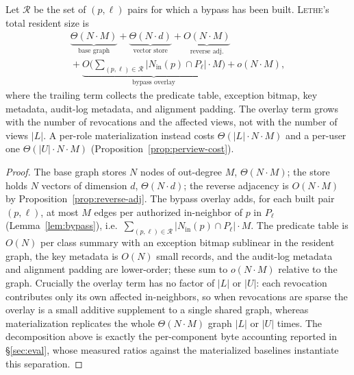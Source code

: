 \documentclass[sigconf, nonacm, review]{acmart}
\newcommand{\Nin}{N_{\mathrm{in}}}
\begin{document}
\begin{proposition}
\label{prop:overlay-space}
Let $\mathcal{R}$ be the set of $(p,\ell)$ pairs for which a bypass has been
built. \textsc{Lethe}'s total resident size is
\[
\begin{gathered}
\underbrace{\Theta(N\cdot M)}_{\text{base graph}}
+\underbrace{\Theta(N\cdot d)}_{\text{vector store}}
+\underbrace{O(N\cdot M)}_{\text{reverse adj.}}\\[2pt]
{}+\underbrace{O\!\Big(\textstyle\sum_{(p,\ell)\in\mathcal{R}}
   |\Nin(p)\cap P_\ell|\cdot M\Big)}_{\text{bypass overlay}}
+ o(N\cdot M),
\end{gathered}
\]
where the trailing term collects the predicate table, exception bitmap, key
metadata, audit-log metadata, and alignment padding. The overlay term grows
with the number of revocations and the affected views, not with the number of
views $|L|$. A per-role materialization instead costs $\Theta(|L|\cdot N\cdot
M)$ and a per-user one $\Theta(|U|\cdot N\cdot M)$
(Proposition~\ref{prop:perview-cost}).
\end{proposition}
\begin{proof}
The base graph stores $N$ nodes of out-degree $M$, $\Theta(N\cdot M)$; the
store holds $N$ vectors of dimension $d$, $\Theta(N\cdot d)$; the reverse
adjacency is $O(N\cdot M)$ by Proposition~\ref{prop:reverse-adj}. The bypass
overlay adds, for each built pair $(p,\ell)$, at most $M$ edges per authorized
in-neighbor of $p$ in $P_\ell$ (Lemma~\ref{lem:bypass}), i.e.\
$\sum_{(p,\ell)\in\mathcal{R}}|\Nin(p)\cap P_\ell|\cdot M$. The predicate table
is $O(N)$ per class summary with an exception bitmap sublinear in the resident
graph, the key metadata is $O(N)$ small records, and the audit-log metadata and
alignment padding are lower-order; these sum to $o(N\cdot M)$ relative to the
graph. Crucially the overlay term has no factor of $|L|$ or $|U|$: each
revocation contributes only its own affected in-neighbors, so when revocations
are sparse the overlay is a small additive supplement to a single shared graph,
whereas materialization replicates the whole $\Theta(N\cdot M)$ graph $|L|$ or
$|U|$ times. The decomposition above is exactly the per-component byte
accounting reported in \S\ref{sec:eval}, whose measured ratios against the
materialized baselines instantiate this separation.
\end{proof}
\end{document}
